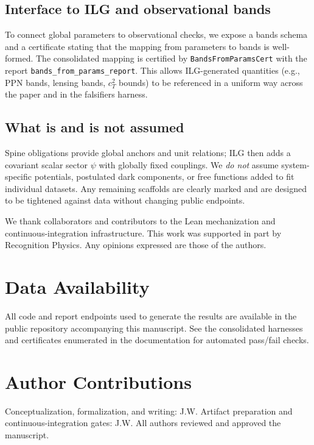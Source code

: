 \documentclass[aps,prd,twocolumn,superscriptaddress,nofootinbib,floatfix,longbibliography]{revtex4-2}
\newcommand{\lean}[1]{\texttt{#1}}
\begin{document}
\subsection{Interface to ILG and observational bands}
To connect global parameters to observational checks, we expose a bands schema and a certificate stating that the mapping from parameters to bands is well-formed. The consolidated mapping is certified by \lean{BandsFromParamsCert} with the report \lean{bands_from_params_report}. This allows ILG-generated quantities (e.g., PPN bands, lensing bands, $c_T^2$ bounds) to be referenced in a uniform way across the paper and in the falsifiers harness.

\subsection{What is and is not assumed}
Spine obligations provide global anchors and unit relations; ILG then adds a covariant scalar sector $\psi$ with globally fixed couplings. We \emph{do not} assume system-specific potentials, postulated dark components, or free functions added to fit individual datasets. Any remaining scaffolds are clearly marked and are designed to be tightened against data without changing public endpoints.

% 
% 
% 
% 
% 
% 
% 
% 
% 
% 
% 
% 

\begin{acknowledgments}
We thank collaborators and contributors to the Lean mechanization and continuous-integration infrastructure. This work was supported in part by Recognition Physics. Any opinions expressed are those of the authors.
\end{acknowledgments}

\section*{Data Availability}
All code and report endpoints used to generate the results are available in the public repository accompanying this manuscript. See the consolidated harnesses and certificates enumerated in the documentation for automated pass/fail checks.

\section*{Author Contributions}
Conceptualization, formalization, and writing: J.W. Artifact preparation and continuous-integration gates: J.W. All authors reviewed and approved the manuscript.



\end{document}
